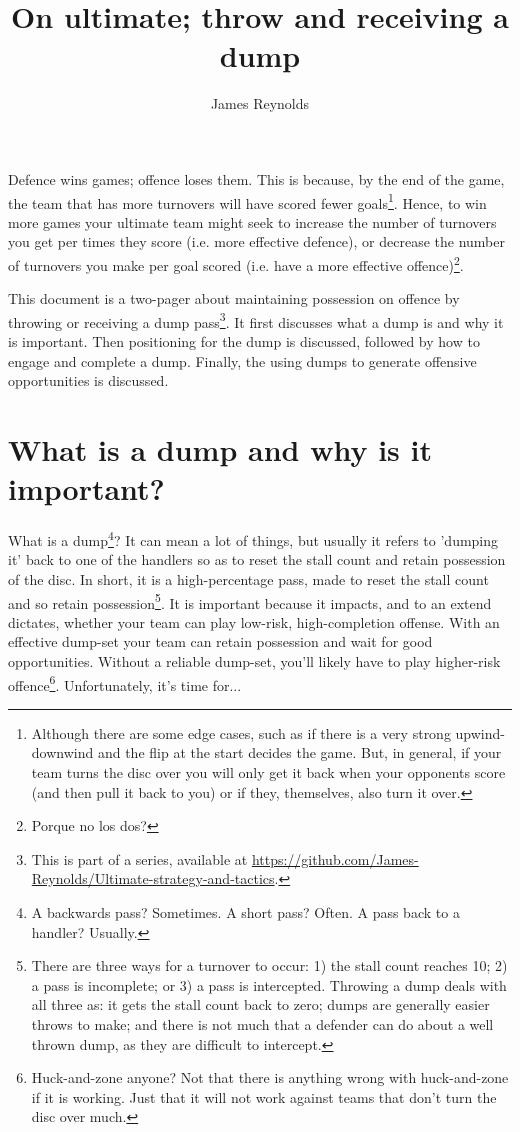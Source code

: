 \documentclass{tufte-handout}
\title{On ultimate; throw and receiving a dump}
\author[James Reynolds]{James Reynolds}
\begin{document}
\maketitle%




Defence wins games; offence loses them.
This is because, 
by the end of the game,  
the team that has more turnovers 
will have scored fewer goals\footnote{
Although there are 
some edge cases, 
such as if there is a 
very strong upwind-downwind 
and the flip 
at the start  
decides the game. 
But,
in general, 
if your team turns the disc over
you will only get it back 
when your opponents 
score 
(and then pull it back to you) 
or if they, 
themselves, 
also turn it over.}. 
Hence, to win more games 
your ultimate team 
might seek to increase the number 
of turnovers you get 
per times they score
(i.e. more effective defence), 
or decrease the number of 
turnovers you make 
per goal scored
(i.e. have a more effective offence)\footnote{
Porque no los dos?}.

This document is  
a two-pager about 
maintaining possession 
on offence by
throwing or 
receiving a dump pass\footnote{
This
is part of a series, 
available at
\url{https://github.com/James-Reynolds/Ultimate-strategy-and-tactics}.}. 
It first discusses 
what a dump is 
and why it is important. 
Then positioning for the dump 
is discussed, 
followed by how to engage 
and complete a dump. 
Finally, the using 
dumps to generate 
offensive opportunities 
is discussed. 

\section{What is a dump and why is it important?}\label{sec:what_is_a_dump}
What is a dump\footnote{
A backwards pass? 
Sometimes.  
A short pass? 
Often. 
A pass back to a handler? 
Usually.}? 
It can mean a lot of things, 
but usually 
it refers to 
'dumping it' 
back to one of the handlers 
so as to 
reset the stall count 
and retain possession 
of the disc.  
In short,
it is 
a high-percentage 
pass, 
made to reset 
the stall count 
and so retain possession\footnote{
There are three ways 
for a turnover to occur:
1) the stall count reaches 10; 
2) a pass is incomplete; or
3) a pass is intercepted. 
Throwing a dump deals 
with all three as:
it gets the stall count back to zero; 
dumps are 
generally easier throws 
to make; and 
there is not much that a defender 
can do about a well thrown dump, 
as they are difficult to intercept. }.  
It is important because 
it impacts, 
and to an extend dictates, 
whether your team can 
play low-risk, high-completion 
offense. 
With an effective dump-set 
your team can retain possession
and wait for  
good opportunities.  
Without a reliable dump-set, 
you'll likely 
have to play higher-risk 
offence\footnote{
Huck-and-zone anyone? 
Not that there is anything 
wrong with huck-and-zone 
if it is working. 
Just that it 
will not 
work against teams
that don't turn the disc over much.}.  
Unfortunately, it's time for...
\end{document}
